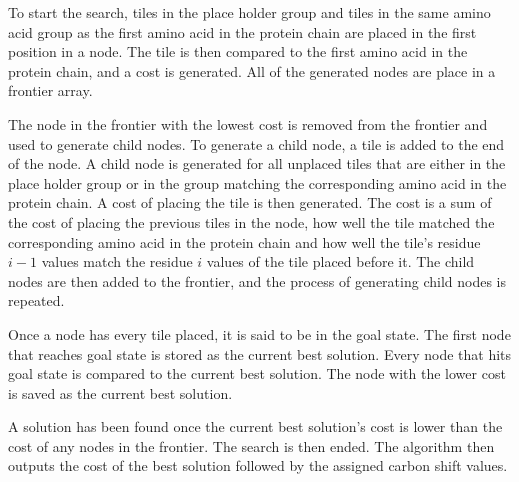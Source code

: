 \documentclass[12pt]{article}
\begin{document}
To start the search, tiles in the place holder group and tiles in the same amino acid group as the first amino acid in the protein chain are placed in the first position in a node. The tile is then compared to the first amino acid in the protein chain, and a cost is generated. All of the generated nodes are place in a frontier array. 

The node in the frontier with the lowest cost is removed from the frontier and used to generate child nodes. To generate a child node, a tile is added to the end of the node. A child node is generated for all unplaced tiles that are either in the place holder group or in the group matching the corresponding amino acid in the protein chain. A cost of placing the tile is then generated. The cost is a sum of the cost of placing the previous tiles in the node, how well the tile matched the corresponding amino acid in the protein chain and how well the tile's residue $i-1$ values match the residue $i$ values of the tile placed before it. The child nodes are then added to the frontier, and the process of generating child nodes is repeated. 

Once a node has every tile placed, it is said to be in the goal state. The first node that reaches goal state is stored as the current best solution. Every node that hits goal state is compared to the current best solution. The node with the lower cost is saved as the current best solution.

A solution has been found once the current best solution's cost is lower than the cost of any nodes in the frontier. The search is then ended. The algorithm then outputs the cost of the best solution followed by the assigned carbon shift values. 



\end{document}
